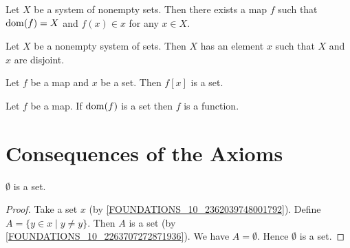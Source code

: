 \documentclass[10pt]{article}
\begin{document}
  \begin{forthel}
    \begin{axiom}
      Let $X$ be a system of nonempty sets.
      Then there exists a map $f$ such that $\operatorname{dom}(f) = X$ and $f(x) \in x$ for
      any $x \in X$.
    \end{axiom}
  \end{forthel}

  \begin{forthel}
    \begin{axiom}[Foundation]
      Let $X$ be a nonempty system of sets.
      Then $X$ has an element $x$ such that $X$ and $x$ are disjoint.
    \end{axiom}
  \end{forthel}

  \begin{forthel}
    \begin{axiom}
      Let $f$ be a map and $x$ be a set.
      Then $f[x]$ is a set.
    \end{axiom}
  \end{forthel}

  \begin{forthel}
    \begin{axiom}
      Let $f$ be a map.
      If $\operatorname{dom}(f)$ is a set then $f$ is a function.
    \end{axiom}
  \end{forthel}


  \section{Consequences of the Axioms}

  \begin{forthel}
    \begin{proposition}
      $\emptyset$ is a set.
    \end{proposition}
    \begin{proof}
      Take a set $x$ (by \cref{FOUNDATIONS_10_2362039748001792}).
      Define $A = \{ y \in x \mid y \neq y \}$.
      Then $A$ is a set (by \cref{FOUNDATIONS_10_2263707272871936}).
      We have $A = \emptyset$.
      Hence $\emptyset$ is a set.
    \end{proof}
  \end{forthel}
\end{document}
